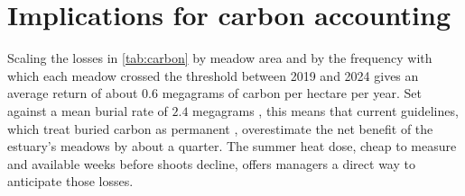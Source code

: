 \section{Implications for carbon accounting}
\label{sec:accounting}

Scaling the losses in \cref{tab:carbon} by meadow area and by the
frequency with which each meadow crossed the threshold between 2019 and
2024 gives an average return of about \(0.6\) megagrams of carbon per
hectare per year. Set against a mean burial rate of \(2.4\) megagrams
\parencite{holmgren2019burial}, this means that current guidelines, which
treat buried carbon as permanent \parencite{bcwg2023guidelines},
overestimate the net benefit of the estuary's meadows by about a quarter.
The summer heat dose, cheap to measure and available weeks before shoots
decline, offers managers a direct way to anticipate those losses.
